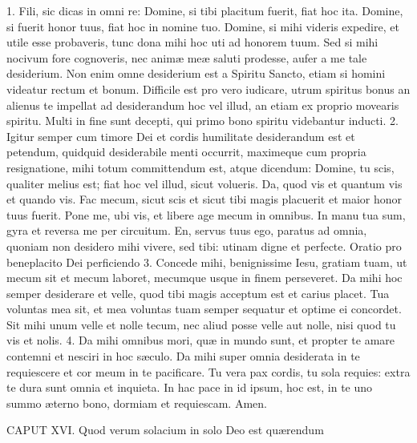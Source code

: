 \documentclass[twoside]{article}
\begin{document}
1. Fili, sic dicas in omni re: Domine, si tibi placitum fuerit, fiat hoc ita. Domine, si fuerit honor tuus, fiat hoc in nomine tuo. Domine, si mihi videris expedire, et utile esse probaveris, tunc dona mihi hoc uti ad honorem tuum. Sed si mihi nocivum fore cognoveris, nec animæ meæ saluti prodesse, aufer a me tale desiderium. Non enim omne desiderium est a Spiritu Sancto, etiam si homini videatur rectum et bonum. Difficile est pro vero iudicare, utrum spiritus bonus an alienus te impellat ad desiderandum hoc vel illud, an etiam ex proprio movearis spiritu. Multi in fine sunt decepti, qui primo bono spiritu videbantur inducti.
2. Igitur semper cum timore Dei et cordis humilitate desiderandum est et petendum, quidquid desiderabile menti occurrit, maximeque cum propria resignatione, mihi totum committendum est, atque dicendum: Domine, tu scis, qualiter melius est; fiat hoc vel illud, sicut volueris. Da, quod vis et quantum vis et quando vis. Fac mecum, sicut scis et sicut tibi magis placuerit et maior honor tuus fuerit. Pone me, ubi vis, et libere age mecum in omnibus. In manu tua sum, gyra et reversa me per circuitum. En, servus tuus ego, paratus ad omnia, quoniam non desidero mihi vivere, sed tibi: utinam digne et perfecte.
Oratio pro beneplacito Dei perficiendo
3. Concede mihi, benignissime Iesu, gratiam tuam, ut mecum sit et mecum laboret, mecumque usque in finem perseveret. Da mihi hoc semper desiderare et velle, quod tibi magis acceptum est et carius placet. Tua voluntas mea sit, et mea voluntas tuam semper sequatur et optime ei concordet. Sit mihi unum velle et nolle tecum, nec aliud posse velle aut nolle, nisi quod tu vis et nolis.
4. Da mihi omnibus mori, quæ in mundo sunt, et propter te amare contemni et nesciri in hoc sæculo. Da mihi super omnia desiderata in te requiescere et cor meum in te pacificare. Tu vera pax cordis, tu sola requies: extra te dura sunt omnia et inquieta. In hac pace in id ipsum, hoc est, in te uno summo æterno bono, dormiam et requiescam. Amen.


CAPUT XVI.
Quod verum solacium in solo Deo est quærendum
\end{document}
